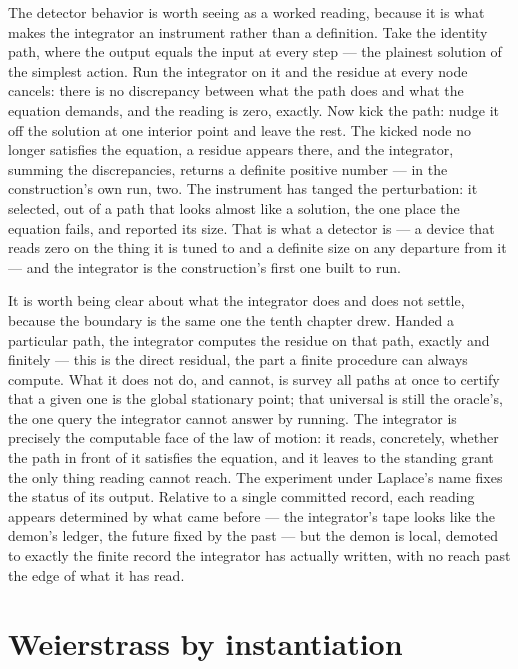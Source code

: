 The detector behavior is worth seeing as a worked reading, because it is what makes the integrator an
instrument rather than a definition. Take the identity path, where the output equals the input at every
step --- the plainest solution of the simplest action. Run the integrator on it and the residue at every
node cancels: there is no discrepancy between what the path does and what the equation demands, and the
reading is zero, exactly. Now kick the path: nudge it off the solution at one interior point and leave
the rest. The kicked node no longer satisfies the equation, a residue appears there, and the integrator,
summing the discrepancies, returns a definite positive number --- in the construction's own run, two. The
instrument has tanged the perturbation: it selected, out of a path that looks almost like a solution, the
one place the equation fails, and reported its size. That is what a detector is --- a device that reads
zero on the thing it is tuned to and a definite size on any departure from it --- and the integrator is
the construction's first one built to run.

It is worth being clear about what the integrator does and does not settle, because the boundary is the
same one the tenth chapter drew. Handed a particular path, the integrator computes the residue on that
path, exactly and finitely --- this is the direct residual, the part a finite procedure can always
compute. What it does not do, and cannot, is survey all paths at once to certify that a given one is the
global stationary point; that universal is still the oracle's, the one query the integrator cannot
answer by running. The integrator is precisely the computable face of the law of motion: it reads,
concretely, whether the path in front of it satisfies the equation, and it leaves to the standing grant
the only thing reading cannot reach. The experiment under Laplace's name fixes the status of its output.
Relative to a single committed record, each reading appears determined by what came before --- the
integrator's tape looks like the demon's ledger, the future fixed by the past --- but the demon is local,
demoted to exactly the finite record the integrator has actually written, with no reach past the edge of
what it has read.

\section{Weierstrass by instantiation}
\label{se:weierstrass-by-instantiation}

